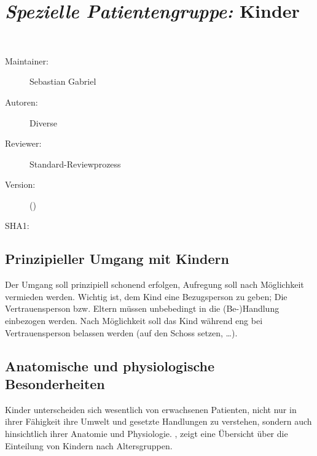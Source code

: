 \def\ChapterCode{KIN}
\chapter
[\CO{[KIN]} \emph{Spezielle Patientengruppe:} Kinder]
{\emph{Spezielle Patientengruppe:} Kinder}
\label{chp:KIN}

\ChapterIntro
{%
~~~
}
{%
\begin{description}
  \item[Maintainer:] Sebastian Gabriel
  \item[Autoren:] Diverse
  \item[Reviewer:] Standard-Reviewprozess
  \item[Version:] {\DocVersion} ({\DocVersionInfo})
  \item[SHA1:] {\DocGitCommit}
\end{description}

{\TxTeilkapitelAASS}
}

\section{Prinzipieller Umgang mit Kindern}

Der Umgang soll prinzipiell schonend erfolgen, Aufregung
soll nach Möglichkeit vermieden werden. Wichtig ist, dem
Kind eine Bezugsperson zu geben; Die Vertrauensperson bzw.
Eltern müssen unbebedingt in die (Be-)Handlung einbezogen
werden. Nach Möglichkeit soll das Kind während eng bei
Vertrauensperson belassen werden (auf den Schoss setzen,
\ldots). 
\nocite{LPN3}


\section{Anatomische und physiologische  Besonderheiten}
\label{topic:kind-besonderheiten}

Kinder unterscheiden sich wesentlich von erwachsenen
Patienten, nicht nur in ihrer Fähigkeit ihre Umwelt und
gesetzte Handlungen zu verstehen, sondern auch hinsichtlich
ihrer Anatomie und Physiologie.
, zeigt
eine Übersicht über die Einteilung von Kindern nach
Altersgruppen.


